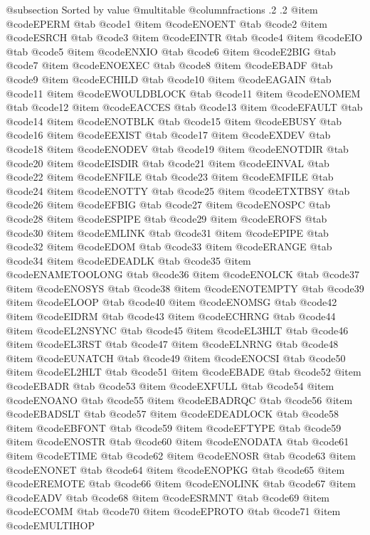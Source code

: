 @subsection Sorted by value
@multitable @columnfractions .2 .2
@item @code{EPERM}
@tab @code{1}
@item @code{ENOENT}
@tab @code{2}
@item @code{ESRCH}
@tab @code{3}
@item @code{EINTR}
@tab @code{4}
@item @code{EIO}
@tab @code{5}
@item @code{ENXIO}
@tab @code{6}
@item @code{E2BIG}
@tab @code{7}
@item @code{ENOEXEC}
@tab @code{8}
@item @code{EBADF}
@tab @code{9}
@item @code{ECHILD}
@tab @code{10}
@item @code{EAGAIN}
@tab @code{11}
@item @code{EWOULDBLOCK}
@tab @code{11}
@item @code{ENOMEM}
@tab @code{12}
@item @code{EACCES}
@tab @code{13}
@item @code{EFAULT}
@tab @code{14}
@item @code{ENOTBLK}
@tab @code{15}
@item @code{EBUSY}
@tab @code{16}
@item @code{EEXIST}
@tab @code{17}
@item @code{EXDEV}
@tab @code{18}
@item @code{ENODEV}
@tab @code{19}
@item @code{ENOTDIR}
@tab @code{20}
@item @code{EISDIR}
@tab @code{21}
@item @code{EINVAL}
@tab @code{22}
@item @code{ENFILE}
@tab @code{23}
@item @code{EMFILE}
@tab @code{24}
@item @code{ENOTTY}
@tab @code{25}
@item @code{ETXTBSY}
@tab @code{26}
@item @code{EFBIG}
@tab @code{27}
@item @code{ENOSPC}
@tab @code{28}
@item @code{ESPIPE}
@tab @code{29}
@item @code{EROFS}
@tab @code{30}
@item @code{EMLINK}
@tab @code{31}
@item @code{EPIPE}
@tab @code{32}
@item @code{EDOM}
@tab @code{33}
@item @code{ERANGE}
@tab @code{34}
@item @code{EDEADLK}
@tab @code{35}
@item @code{ENAMETOOLONG}
@tab @code{36}
@item @code{ENOLCK}
@tab @code{37}
@item @code{ENOSYS}
@tab @code{38}
@item @code{ENOTEMPTY}
@tab @code{39}
@item @code{ELOOP}
@tab @code{40}
@item @code{ENOMSG}
@tab @code{42}
@item @code{EIDRM}
@tab @code{43}
@item @code{ECHRNG}
@tab @code{44}
@item @code{EL2NSYNC}
@tab @code{45}
@item @code{EL3HLT}
@tab @code{46}
@item @code{EL3RST}
@tab @code{47}
@item @code{ELNRNG}
@tab @code{48}
@item @code{EUNATCH}
@tab @code{49}
@item @code{ENOCSI}
@tab @code{50}
@item @code{EL2HLT}
@tab @code{51}
@item @code{EBADE}
@tab @code{52}
@item @code{EBADR}
@tab @code{53}
@item @code{EXFULL}
@tab @code{54}
@item @code{ENOANO}
@tab @code{55}
@item @code{EBADRQC}
@tab @code{56}
@item @code{EBADSLT}
@tab @code{57}
@item @code{EDEADLOCK}
@tab @code{58}
@item @code{EBFONT}
@tab @code{59}
@item @code{EFTYPE}
@tab @code{59}
@item @code{ENOSTR}
@tab @code{60}
@item @code{ENODATA}
@tab @code{61}
@item @code{ETIME}
@tab @code{62}
@item @code{ENOSR}
@tab @code{63}
@item @code{ENONET}
@tab @code{64}
@item @code{ENOPKG}
@tab @code{65}
@item @code{EREMOTE}
@tab @code{66}
@item @code{ENOLINK}
@tab @code{67}
@item @code{EADV}
@tab @code{68}
@item @code{ESRMNT}
@tab @code{69}
@item @code{ECOMM}
@tab @code{70}
@item @code{EPROTO}
@tab @code{71}
@item @code{EMULTIHOP}
